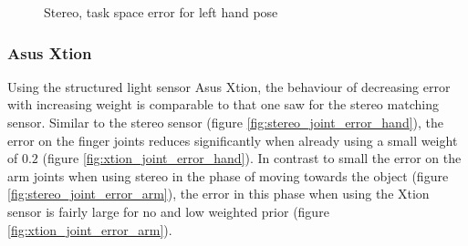 \begin{figure}
\centering
{}

\caption{Stereo, task space error for left hand pose}
\label{fig:stereo_hand_pose_error}
\end{figure}



\subsubsection{Asus Xtion}

Using the structured light sensor Asus Xtion, the behaviour of decreasing error with increasing weight is comparable to that one saw for the stereo matching sensor. Similar to the stereo sensor (figure \ref{fig:stereo_joint_error_hand}), the error on the finger joints reduces significantly when already using a small weight of $0.2$ (figure \ref{fig:xtion_joint_error_hand}).
In contrast to small the error on the arm joints when using stereo in the phase of moving towards the object (figure \ref{fig:stereo_joint_error_arm}), the error in this phase when using the Xtion sensor is fairly large for no and low weighted prior (figure \ref{fig:xtion_joint_error_arm}).

